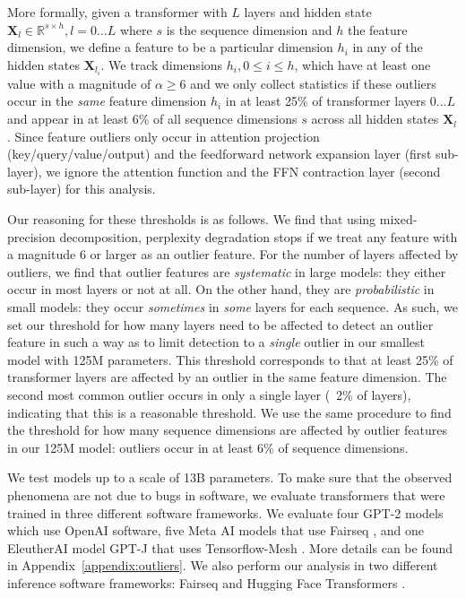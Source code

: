 More formally, given a transformer with $L$ layers and hidden state $\mathbf{X}_l\in \mathbb{R}^{s\times h}, l=0...L$ where $s$ is the sequence dimension and $h$ the feature dimension, we define a feature to be a particular dimension $h_i$ in any of the hidden states $\mathbf{X}_{l_{i}}$. We track dimensions $h_i, 0 \leq i \leq h$, which have at least one value with a magnitude of $\alpha\geq6$ and we only collect statistics if these outliers occur in the {\it same} feature dimension $h_i$ in at least 25\% of transformer layers $0...L$ and appear in at least 6\% of all sequence dimensions $s$ across all hidden states $\mathbf{X}_l$. Since feature outliers only occur in attention projection (key/query/value/output) and the feedforward network expansion layer (first sub-layer), we ignore the attention function and the FFN contraction layer (second sub-layer) for this analysis.

Our reasoning for these thresholds is as follows. We find that using mixed-precision decomposition, perplexity degradation stops if we treat any feature with a magnitude 6 or larger as an outlier feature. For the number of layers affected by outliers, we find that outlier features are {\it systematic} in large models: they either occur in most layers or not at all. On the other hand, they are {\it probabilistic} in small models: they occur {\it sometimes} in {\it some} layers for each sequence. As such, we set our threshold for how many layers need to be affected to detect an outlier feature in such a way as to limit detection to a {\it single} outlier in our smallest model with 125M parameters. This threshold corresponds to that at least 25\% of transformer layers are affected by an outlier in the same feature dimension. The second most common outlier occurs in only a single layer (~2\% of layers), indicating that this is a reasonable threshold. We use the same procedure to find the threshold for how many sequence dimensions are affected by outlier features in our 125M model: outliers occur in at least 6\% of sequence dimensions.

We test models up to a scale of 13B parameters. To make sure that the observed phenomena are not due to bugs in software, we evaluate transformers that were trained in three different software frameworks. We evaluate four GPT-2 models which use OpenAI software, five Meta AI models that use Fairseq \citep{ott2019fairseq}, and one EleutherAI model GPT-J that uses Tensorflow-Mesh \citep{shazeer2018mesh}. More details can be found in Appendix~\ref{appendix:outliers}. We also perform our analysis in two different inference software frameworks: Fairseq and Hugging Face Transformers \citep{wolf2019huggingface}. 

